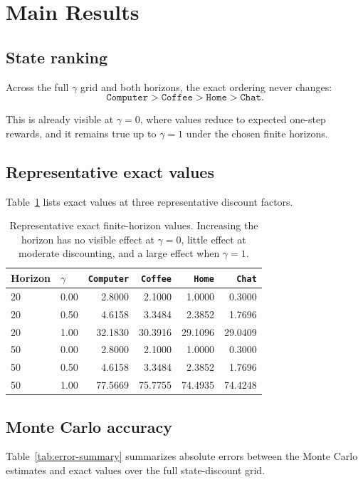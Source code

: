 \documentclass[11pt]{article}
\begin{document}
\section{Main Results}

\subsection{State ranking}
Across the full $\gamma$ grid and both horizons, the exact ordering never changes:
\[
\texttt{Computer} > \texttt{Coffee} > \texttt{Home} > \texttt{Chat}.
\]

This is already visible at $\gamma=0$, where values reduce to expected one-step rewards, and it remains true up to $\gamma=1$ under the chosen finite horizons.

\subsection{Representative exact values}
Table~\ref{tab:representative-values} lists exact values at three representative discount factors.

\begin{table}[H]
\centering
\begin{tabular}{llrrrr}
\toprule
Horizon & $\gamma$ & \texttt{Computer} & \texttt{Coffee} & \texttt{Home} & \texttt{Chat} \\
\midrule
20 & 0.00 & 2.8000 & 2.1000 & 1.0000 & 0.3000 \\
20 & 0.50 & 4.6158 & 3.3484 & 2.3852 & 1.7696 \\
20 & 1.00 & 32.1830 & 30.3916 & 29.1096 & 29.0409 \\
\midrule
50 & 0.00 & 2.8000 & 2.1000 & 1.0000 & 0.3000 \\
50 & 0.50 & 4.6158 & 3.3484 & 2.3852 & 1.7696 \\
50 & 1.00 & 77.5669 & 75.7755 & 74.4935 & 74.4248 \\
\bottomrule
\end{tabular}
\caption{Representative exact finite-horizon values. Increasing the horizon has no visible effect at $\gamma=0$, little effect at moderate discounting, and a large effect when $\gamma=1$.}
\label{tab:representative-values}
\end{table}

\subsection{Monte Carlo accuracy}
Table~\ref{tab:error-summary} summarizes absolute errors between the Monte Carlo estimates and exact values over the full state-discount grid.
\end{document}
